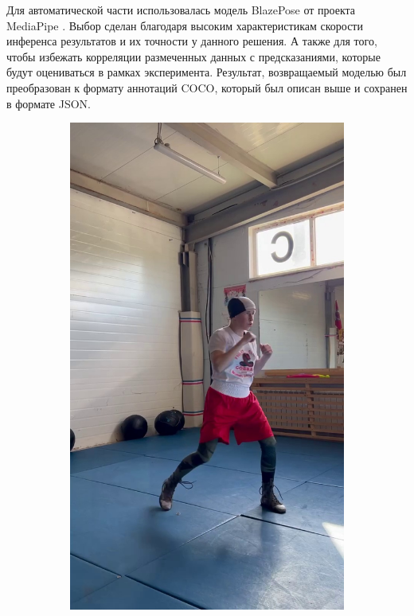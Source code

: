 Для автоматической части использовалась модель BlazePose от проекта MediaPipe \cite{mediapipe}. Выбор сделан благодаря высоким характеристикам скорости инференса результатов и их точности у данного решения. А также для того, чтобы избежать корреляции размеченных данных с предсказаниями, которые будут оцениваться в рамках эксперимента. Результат, возвращаемый моделью был преобразован к формату аннотаций COCO, который был описан выше и сохранен в формате JSON. 

\begin{figure}[h]
\begin{subfigure}[b]{0.32\textwidth}
	\centering
	\includegraphics[width=\textwidth]{./images/data_info/pose_markup_examples/raw}

\end{subfigure}
\end{figure}
